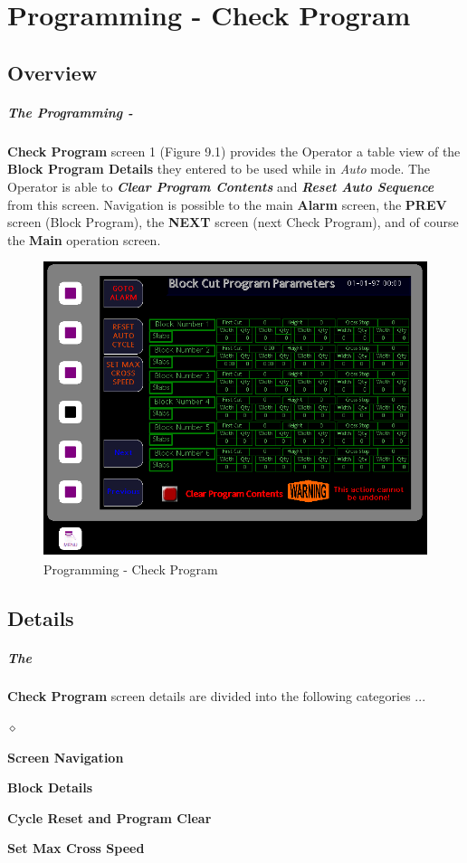 \chapter{Programming - Check Program}
\section{Overview}\paragraph*{The Programming -}\textbf{ Check Program} screen 1 (Figure 9.1) provides the Operator a table view of the \textbf{Block Program Details} they entered to be used while in \textit{Auto} mode. The Operator is able to \textbf{\textit{Clear Program Contents}} and \textbf{\textit{Reset Auto Sequence}} from this screen. Navigation is possible to the main \textbf{Alarm} screen, the \textbf{PREV} screen (Block Program), the \textbf{NEXT} screen (next Check Program), and of course the \textbf{Main} operation screen.
\begin{figure}
	\centering
	\includegraphics[width=0.5\linewidth]{screen-captures/program/pgm_review1}
	\caption{Programming - Check Program}
	\label{fig:prg-chk-prg}
\end{figure}
\section{Details}\paragraph*{The}\textbf{Check Program} screen details are divided into the following categories ...
\begin{list}{$\diamond$}{}
	\item \textbf{Screen Navigation}
	\item \textbf{Block Details}
	\item \textbf{Cycle Reset and Program Clear}
	\item \textbf{Set Max Cross Speed}
\end{list}
\pagebreak
